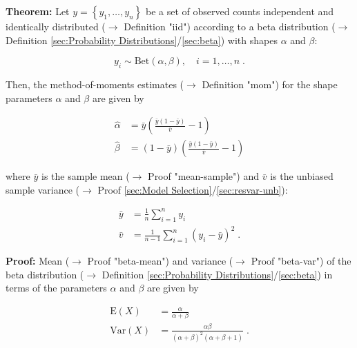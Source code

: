 \documentclass[a4paper,12pt,twoside]{book}
\begin{document}
\textbf{Theorem:} Let $y = \left\lbrace y_1, \ldots, y_n \right\rbrace$ be a set of observed counts independent and identically distributed ($\rightarrow$ Definition "iid") according to a beta distribution ($\rightarrow$ Definition \ref{sec:Probability Distributions}/\ref{sec:beta}) with shapes $\alpha$ and $\beta$:

\begin{equation} \label{eq:beta-mom-Beta}
y_i \sim \mathrm{Bet}(\alpha,\beta), \quad i = 1, \ldots, n \; .
\end{equation}

Then, the method-of-moments estimates ($\rightarrow$ Definition "mom") for the shape parameters $\alpha$ and $\beta$ are given by

\begin{equation} \label{eq:beta-mom-Beta-MoM}
\begin{split}
\hat{\alpha} &= \bar{y} \left( \frac{\bar{y} (1-\bar{y})}{\bar{v}} - 1  \right) \\
\hat{\beta} &= (1-\bar{y}) \left( \frac{\bar{y} (1-\bar{y})}{\bar{v}} - 1  \right)
\end{split}
\end{equation}

where $\bar{y}$ is the sample mean ($\rightarrow$ Proof "mean-sample") and $\bar{v}$ is the unbiased sample variance ($\rightarrow$ Proof \ref{sec:Model Selection}/\ref{sec:resvar-unb}):

\begin{equation} \label{eq:beta-mom-y-mean-var}
\begin{split}
\bar{y} &= \frac{1}{n} \sum_{i=1}^n y_i \\
\bar{v} &= \frac{1}{n-1} \sum_{i=1}^n (y_i - \bar{y})^2 \; .
\end{split}
\end{equation}


\vspace{1em}
\textbf{Proof:} Mean ($\rightarrow$ Proof "beta-mean") and variance ($\rightarrow$ Proof "beta-var") of the beta distribution ($\rightarrow$ Definition \ref{sec:Probability Distributions}/\ref{sec:beta}) in terms of the parameters $\alpha$ and $\beta$ are given by

\begin{equation} \label{eq:beta-mom-Beta-E-Var}
\begin{split}
\mathrm{E}(X) &= \frac{\alpha}{\alpha+\beta} \\
\mathrm{Var}(X) &= \frac{\alpha\beta}{(\alpha+\beta)^2 (\alpha+\beta+1)} \; .
\end{split}
\end{equation}
\end{document}
